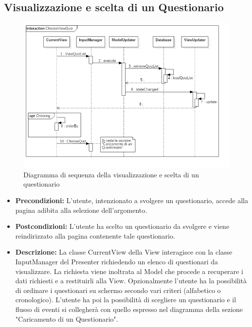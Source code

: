 \documentclass[a4paper,11pt]{article}
\begin{document}
	\subsection{Visualizzazione e scelta di un Questionario}
	\begin{figure}[h!]
	\begin{center}
		\includegraphics[scale=0.6]{../images/ChooseViewQuiz.png}
		\caption{Diagramma di sequenza della visualizzazione e scelta di un questionario}
	\end{center}
	\end{figure}
	\begin{itemize}
	\item\textbf{Precondizioni:} L'utente, intenzionato a svolgere un questionario, accede alla pagina adibita alla selezione dell'argomento.\\
	\item\textbf{Postcondizioni:} L'utente ha scelto un questionario da svolgere e viene reindirizzato alla pagina contenente tale questionario.\\ %
	\item\textbf{Descrizione:} La classe CurrentView della View interagisce con la classe InputManager
del Presenter richiedendo un elenco di questionari da visualizzare. La richiesta viene
inoltrata al Model che procede a recuperare i dati richiesti e a restituirli alla View. Opzionalmente
l’utente ha la possibilità di ordinare i questionari su schermo secondo vari criteri
(alfabetico o cronologico). L’utente ha poi la possibilità di scegliere un questionario e il flusso di eventi si collegherà con quello espresso nel diagramma della sezione "Caricamento
di un Questionario".
	\end{itemize}
	\newpage
	
\end{document}
